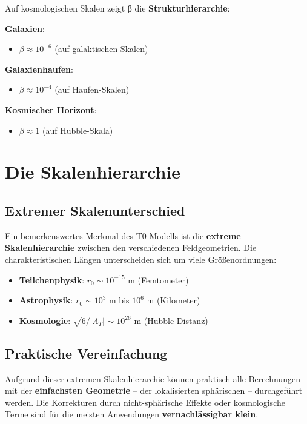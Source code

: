 \documentclass[12pt,a4paper]{report}
\begin{document}
Auf kosmologischen Skalen zeigt β die \textbf{Strukturhierarchie}:

\textbf{Galaxien}:
\begin{itemize}
	\item $\beta \approx 10^{-6}$ (auf galaktischen Skalen)
\end{itemize}

\textbf{Galaxienhaufen}:
\begin{itemize}
	\item $\beta \approx 10^{-4}$ (auf Haufen-Skalen)
\end{itemize}

\textbf{Kosmischer Horizont}:
\begin{itemize}
	\item $\beta \approx 1$ (auf Hubble-Skala)
\end{itemize}

\section{Die Skalenhierarchie}

\subsection{Extremer Skalenunterschied}

Ein bemerkenswertes Merkmal des T0-Modells ist die \textbf{extreme Skalenhierarchie} zwischen den verschiedenen Feldgeometrien. Die charakteristischen Längen unterscheiden sich um viele Größenordnungen:

\begin{itemize}
	\item \textbf{Teilchenphysik}: $r_0 \sim 10^{-15}$ m (Femtometer)
	\item \textbf{Astrophysik}: $r_0 \sim 10^3$ m bis $10^6$ m (Kilometer)
	\item \textbf{Kosmologie}: $\sqrt{6/|\Lambda_T|} \sim 10^{26}$ m (Hubble-Distanz)
\end{itemize}

\subsection{Praktische Vereinfachung}

Aufgrund dieser extremen Skalenhierarchie können praktisch alle Berechnungen mit der \textbf{einfachsten Geometrie} -- der lokalisierten sphärischen -- durchgeführt werden. Die Korrekturen durch nicht-sphärische Effekte oder kosmologische Terme sind für die meisten Anwendungen \textbf{vernachlässigbar klein}.
\end{document}
